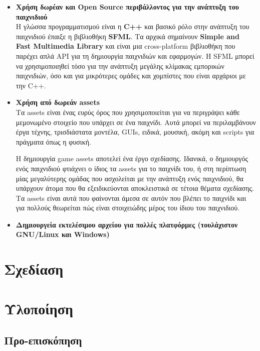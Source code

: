 \documentclass[12pt]{article}
\begin{document}
	\begin{itemize}
		\item \textbf{Χρήση δωρέαν και Open Source περιβάλλοντος για την ανάπτυξη του παιχνιδιού}\\
		Η γλώσσα προγραμματισμού είναι η \textbf{C++} και βασικό ρόλο στην ανάπτυξη του παιχνιδιού έπαιξε η βιβλιοθήκη \textbf{SFML}. Τα αρχικά σημαίνουν \textbf{Simple and Fast Multimedia Library} και είναι μια cross-platform βιβλιοθήκη που παρέχει απλά API για τη δημιουργία παιχνιδιών και εφαρμογών. Η SFML μπορεί να χρησιμοποιηθεί τόσο για την ανάπτυξη μεγάλης κλίμακας εμπορικών παιχνιδιών, όσο και για μικρότερες ομάδες και χομπίστες που είναι αρχάριοι με την C++.
		
		\item \textbf{Χρήση από δωρεάν assets}\\
		Τα assets είναι ένας ευρύς όρος που χρησιμοποιείται για να περιγράψει κάθε μεμονωμένο στοιχείο που υπάρχει σε ένα παιχνίδι. Αυτά μπορεί να περιλαμβάνουν έργα τέχνης, τρισδιάστατα μοντέλα, GUIs, ειδικά, μουσική, ακόμη και scripts για πράγματα όπως η φυσική.
		
		Η δημιουργία game assets αποτελεί ένα έργο σχεδίασης. Ιδανικά, ο δημιουργός ενός παιχνιδιού φτιάχνει ο ίδιος τα assets για το παιχνίδι του, ή στη περίπτωση μίας μεγαλύτερης ομάδας που ασχολείται με την ανάπτυξη ενός παιχνιδιού, θα υπάρχουν άτομα που θα εξειδικεύονται αποκλειστικά σε τέτοια θέματα σχεδίασης. Τα assets είναι αυτά που φαίνονται άμεσα σε αυτόν που βλέπει το παιχνίδι και για πολλούς θεωρείται πώς είναι στοιχειώδης μέρος του ίδιου του παιχνιδιού. 
		
		
		\item \textbf{Δημιουργεία εκτελέσιμου αρχείου για πολλές πλατφόρμες (τουλάχιστον GNU/Linux και Windows)}\\
		
		
		
	\end{itemize}
	
	
	
	
	
	\section{Σχεδίαση}
	
	\section{Υλοποίηση}
	
	\subsection{Προ-επισκόπηση}
	
\end{document}
